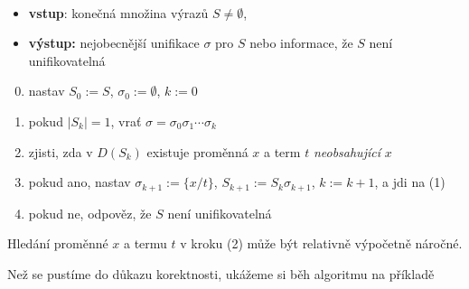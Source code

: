 \begin{algorithm}{\,}
\begin{itemize}
    \item \textbf{vstup}: konečná množina výrazů $S\neq\emptyset$,
    \item \textbf{výstup:} nejobecnější unifikace $\sigma$ pro $S$ nebo informace, že $S$ není unifikovatelná
\end{itemize}
\begin{enumerate}[(1)]\setcounter{enumi}{-1}
    \item nastav $S_0:=S$, $\sigma_0:=\emptyset$, $k:=0$
    \item pokud $|S_k|=1$, vrať $\sigma=\sigma_0\sigma_1\cdots \sigma_k$
    \item zjisti, zda v $D(S_k)$ existuje proměnná $x$ a term $t$ \emph{neobsahující} $x$
    \item pokud ano, nastav $\sigma_{k+1}:=\{x/t\}$, $S_{k+1}:=S_k\sigma_{k+1}$, $k:=k+1$, a jdi na (1)
    \item pokud ne, odpověz, že $S$ není unifikovatelná
\end{enumerate}
\end{algorithm}

\begin{remark}
    Hledání proměnné $x$ a termu $t$ v kroku (2) může být relativně výpočetně náročné.
\end{remark}

Než se pustíme do důkazu korektnosti, ukážeme si běh algoritmu na příkladě

